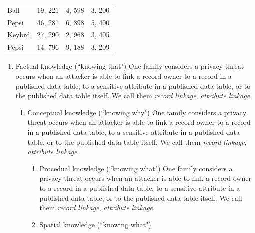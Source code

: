 \begin{table}[b!]%
\begin{tabular}{@{}lccc@{}}
Ball &19, 221 &4, 598   &3, 200\\
Pepsi &46, 281 &6, 898 &5, 400\\
Keybrd   &27, 290 &2, 968 &3, 405\\
Pepsi    &14, 796 &9, 188 &3, 209\\
\end{tabular}
\end{table}


\begin{enumerate}
\item Factual knowledge (``knowing that") One family considers a privacy
threat occurs when an attacker is able to link a record owner to a record
in a published data table, to a sensitive attribute in a published data
table, or to the published data table itself. We call them \emph{record
linkage}, \emph{attribute linkage}.
\begin{enumerate}
\item Conceptual knowledge (``knowing why") One family considers a privacy
threat occurs when an attacker is able to link a record owner to a record
in a published data table, to a sensitive attribute in a published data
table, or to the published data table itself. We call them \emph{record
linkage}, \emph{attribute linkage}.
\begin{enumerate}
\item Procedual knowledge (``knowing what") One family considers a privacy
threat occurs when an attacker is able to link a record owner to a record
in a published data table, to a sensitive attribute in a published data
table, or to the published data table itself. We call them \emph{record
linkage}, \emph{attribute linkage}.
\item Spatial knowledge (``knowing what")
\end{enumerate}
\end{enumerate}
\end{enumerate}

